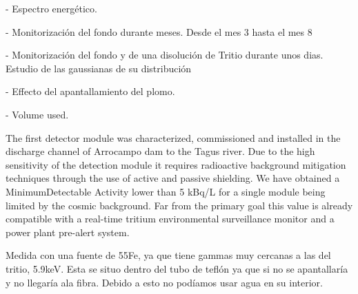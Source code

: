 - Espectro energético.

- Monitorización del fondo durante meses. Desde el mes 3 hasta el mes 8

- Monitorización del fondo y de una disolución de Tritio durante unos dias. Estudio de las gaussianas de su distribución 

- Effecto del apantallamiento del plomo.

- Volume used.









The first detector module was characterized, commissioned and installed in the discharge channel of Arrocampo dam to the Tagus river. Due to the high sensitivity of the detection module it requires radioactive background mitigation techniques through the use of active and passive shielding. We have obtained a MinimumDetectable Activity lower than 5 kBq/L for a single module being limited by the cosmic background. Far from the primary goal this value is already compatible with a real-time tritium environmental surveillance monitor and a power plant pre-alert system.


Medida con una fuente de 55Fe, ya que tiene gammas muy cercanas a las del tritio, 5.9keV. Esta se situo dentro del tubo de teflón ya que si no se apantallaría y no llegaría  ala fibra. Debido a esto no podíamos usar agua en su interior.


